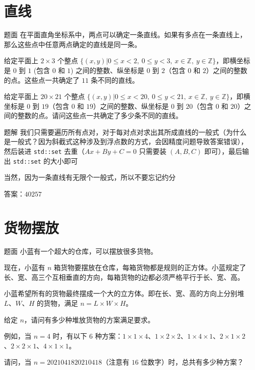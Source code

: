 \documentclass{pptt}
\begin{document}
\section{直线}

\begin{frame}{题面}
    在平面直角坐标系中，两点可以确定一条直线。如果有多点在一条直线上，那么这些点中任意两点确定的直线是同一条。

    给定平面上 $2 \times 3$ 个整点 $\{(x,y)|0 \leq x < 2,~0 \leq y < 3,~x \in \mathbb{Z},~y \in \mathbb{Z}\}$，即横坐标是 $0$ 到 $1$ (包含 $0$ 和 $1$) 之间的整数、纵坐标是 $0$ 到 $2$（包含 $0$ 和 $2$）之间的整数的点。这些点一共确定了 $11$ 条不同的直线。

    给定平面上 $20 \times 21$ 个整点 $\{(x,y)|0 \leq x < 20,~0 \leq y < 21,~x \in \mathbb{Z},~y \in \mathbb{Z}\}$，即横坐标是 $0$ 到 $19$（包含 $0$ 和 $19$）之间的整数、纵坐标是 $0$ 到 $20$（包含 $0$ 和 $20$）之间的整数的点。请问这些点一共确定了多少条不同的直线。
\end{frame}

\begin{frame}{题解}
    我们只需要遍历所有点对，对于每对点对求出其所成直线的一般式（为什么是一般式？因为斜截式这种涉及到浮点数的方式，会因精度问题导致答案错误），然后装进 \texttt{std::set} 去重（$Ax+By+C=0$ 只需要装 $(A,B,C)$ 即可），最后输出 \texttt{std::set} 的大小即可

    当然，因为一条直线有无限个一般式，所以不要忘记约分

    答案：$40257$
\end{frame}

\section{货物摆放}

\begin{frame}{题面}
    小蓝有一个超大的仓库，可以摆放很多货物。

    现在，小蓝有 $n$ 箱货物要摆放在仓库，每箱货物都是规则的正方体。小蓝规定了长、宽、高三个互相垂直的方向，每箱货物的边都必须严格平行于长、宽、高。

    小蓝希望所有的货物最终摆成一个大的立方体。即在长、宽、高的方向上分别堆 $L$、$W$、$H$ 的货物，满足 $n=L \times W \times H$。

    给定 $n$，请问有多少种堆放货物的方案满足要求。

    例如，当 $n=4$ 时，有以下 $6$ 种方案：$1 \times 1 \times 4$、$1 \times 2 \times 2$、$1 \times 4 \times 1$、$2 \times 1 \times 2$、$2 \times 2 \times 1$、$4 \times 1 \times 1$。

    请问，当 $n=2021041820210418$（注意有 $16$ 位数字）时，总共有多少种方案？
\end{frame}
\end{document}
